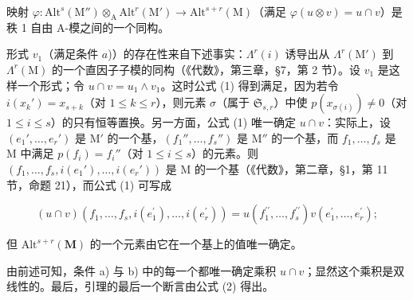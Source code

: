 映射 \(\varphi : \mathrm{Alt}^s (\mathrm{M}'')\otimes_{\mathrm{A}}\mathrm{Alt}^r (\mathrm{M}')\to \mathrm{Alt}^{s + r}(\mathrm{M})\)（满足 \(\varphi (u\otimes v) = u\cap v\)）是秩 1 自由 A-模之间的一个同构。

形式 \(v_{1}\)（满足条件 \(a\))）的存在性来自下述事实：\(\Lambda^r (i)\) 诱导出从 \(\Lambda^r (\mathrm{M}')\) 到 \(\Lambda^r (\mathrm{M})\) 的一个直因子子模的同构（《代数》，第三章，§7，第 2 节）。设 \(v_{1}\) 是这样一个形式；令 \(u\cap v = u_{1}\wedge v_{1}\)。这时公式 (1) 得到满足，因为若令 \(i(x_k') = x_{s + k}\)（对 \(1\leq k\leq r\)），则元素 \(\sigma\)（属于 \(\mathfrak{S}_{s,r}\)）中使 \(p(x_{\sigma (i)})\neq 0\)（对 \(1\leq i\leq s\)）的只有恒等置换。另一方面，公式 (1) 唯一确定 \(u\cap v\)：实际上，设 \((e_1',\ldots ,e_r')\) 是 \(\mathrm{M}'\) 的一个基，\((f_1'',\dots,f_s'')\) 是 \(\mathrm{M}''\) 的一个基，而 \(f_{1},\ldots ,f_{s}\) 是 \(\mathrm{M}\) 中满足 \(p(f_i) = f_i''\)（对 \(1\leq i\leq s\)）的元素。则 \((f_{1},\ldots ,f_{s},i(e_1'),\ldots ,i(e_r'))\) 是 \(\mathrm{M}\) 的一个基（《代数》，第二章，§1，第 11 节，命题 21），而公式 (1) 可写成

\[
(u \cap v) (f _ {1}, \dots , f _ {s}, i (e _ {1} ^ {\prime}), \dots , i (e _ {r} ^ {\prime})) = u (f _ {1} ^ {\prime \prime}, \dots , f _ {s} ^ {\prime \prime}) v (e _ {1} ^ {\prime}, \dots , e _ {r} ^ {\prime});\tag{2}
\]

但 \(\mathrm{Alt}^{s + r}(\mathbf{M})\) 的一个元素由它在一个基上的值唯一确定。

由前述可知，条件 a) 与 b) 中的每一个都唯一确定乘积 \(u \cap v\)；显然这个乘积是双线性的。最后，引理的最后一个断言由公式 (2) 得出。
\relax{}
